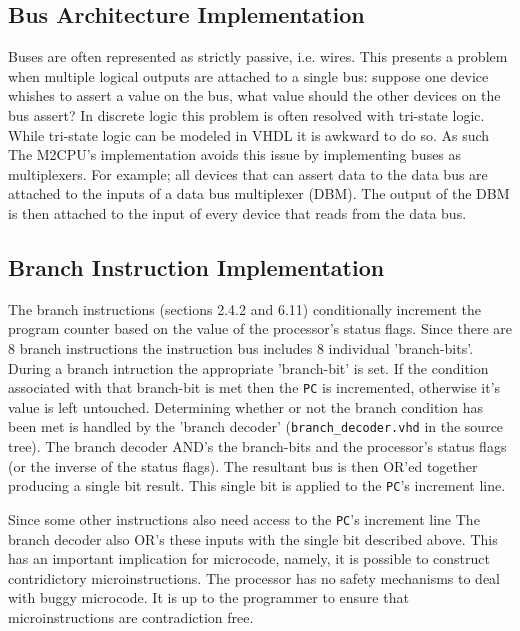 \documentclass[a4paper,12pt]{article}
\newcommand{\mt}{M2CPU}
\newcommand{\PC}{\texttt{PC}}
\begin{document}
\subsection{Bus Architecture Implementation}
Buses are often represented as strictly passive, i.e. wires. This presents a 
problem when multiple logical outputs are attached to a single bus: suppose one
device whishes to assert a value on the bus, what value should the other 
devices on the bus assert? In discrete logic this problem is often resolved with
tri-state logic. While tri-state logic can be modeled in VHDL it is awkward to 
do so. As such The \mt{}'s implementation avoids this issue by implementing 
buses as multiplexers. For example; all devices that can assert data to the data
bus are attached to the inputs of a data bus multiplexer (DBM). The output of 
the DBM is then attached to the input of every device that reads from the data 
bus.
\par

\subsection{Branch Instruction Implementation}
The branch instructions (sections 2.4.2 and 6.11) conditionally increment the
program counter based on the value of the processor's status flags. Since there
are 8 branch instructions the instruction bus includes 8 individual 
'branch-bits'. During a branch intruction the appropriate 'branch-bit' is set.
If the condition associated with that branch-bit is met then the \PC{} is 
incremented, otherwise it's value is left untouched. Determining whether or 
not the branch condition has been met is handled by the 'branch decoder'
(\texttt{branch\_decoder.vhd} in the source tree). The branch decoder AND's
the branch-bits and the processor's status flags (or the inverse of the status
flags). The resultant bus is then OR'ed together producing a single bit result.
This single bit is applied to the \PC{}'s increment line.
\par

Since some other instructions also need access to the \PC{}'s increment line
The branch decoder also OR's these inputs with the single bit described above.
This has an important implication for microcode, namely, it is possible to 
construct contridictory microinstructions. The processor has no safety 
mechanisms to deal with buggy microcode. It is up to the programmer to ensure
that microinstructions are contradiction free.
\par
\end{document}
